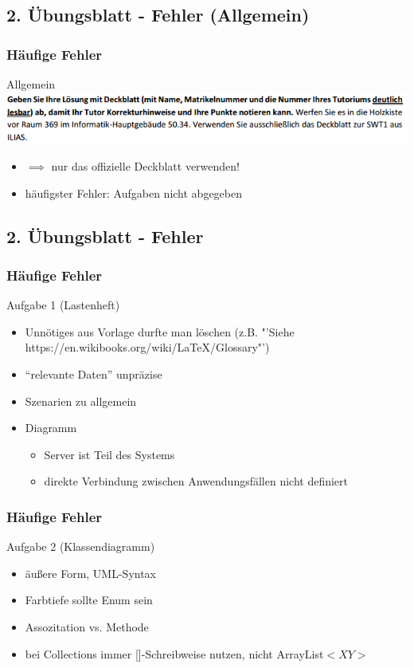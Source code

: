 \documentclass[18pt]{beamer}
\begin{document}
	
	\subsection{2. Übungsblatt - Fehler (Allgemein)}
	\begin{frame}
		\frametitle{Häufige Fehler}
		\begin{block}{Allgemein}
			\includegraphics[scale=0.6]{./pics/tut2/deckblatt.png}
			\begin{itemize}
				\item $\implies$ nur das offizielle Deckblatt verwenden!
				\pause
				\item häufigster Fehler: Aufgaben nicht abgegeben
			\end{itemize}
		\end{block}
	\end{frame}
	
	\subsection{2. Übungsblatt - Fehler}
	\begin{frame}
		\frametitle{Häufige Fehler}
		\begin{block}{Aufgabe 1 (Lastenheft)}
			\begin{itemize}
				\item Unnötiges aus Vorlage durfte man löschen (z.B. "'Siehe https://en.wikibooks.org/wiki/LaTeX/Glossary"')
				\pause
				\item \enquote{relevante Daten} unpräzise
				\pause
				\item Szenarien zu allgemein
				\pause
				\item Diagramm
				\begin{itemize}
					\item Server ist Teil des Systems
					\item direkte Verbindung zwischen Anwendungsfällen nicht definiert
				\end{itemize}
			\end{itemize}
		\end{block}
	\end{frame}

	\begin{frame}
		\frametitle{Häufige Fehler}
		\begin{block}{Aufgabe 2 (Klassendiagramm)}
			\begin{itemize}
				\item äußere Form, UML-Syntax
				\pause
				\item Farbtiefe sollte Enum sein
				\pause
				\item Assozitation vs. Methode
				\pause
				\item bei Collections immer []-Schreibweise nutzen, nicht ArrayList$<XY>$
			\end{itemize}
		\end{block}
	\end{frame}
\end{document}
